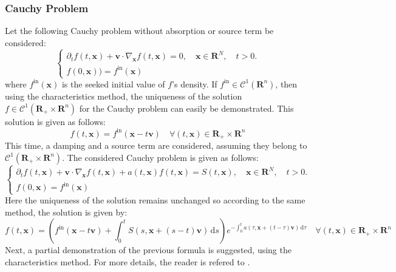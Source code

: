\documentclass[a4paper, 11pt]{article}
\newcommand{\bm}{\symbf}
\newcommand{\di}{\ensuremath{\, \mathrm{d}}}
\begin{document}
\subsubsection{Cauchy Problem}

Let the following Cauchy problem without absorption or source term be considered:
\[
\begin{cases}
\partial_t f(t,\bm{x})+\bm{v} \cdot \nabla_{\bm{x}} f(t,\bm{x})=0, \quad \bm{x} \in \bm{R}^N, \quad t>0.\\
f(0,\bm{x})) = f^{\mathrm{in}}(\bm{x})
\end{cases}
\]
where $f^{\mathrm{in}}(\bm{x})$ is the seeked initial value of $f$'s density. If $f^{\mathrm{in}} \in \mathcal{C}^1(\bm{R}^n)$, then using the characteristics method, the uniqueness of the solution $f \in \mathcal{C}^1(\bm{R}_+ \times \bm{R}^n)$ for the Cauchy problem can easily be demonstrated. This solution is given as follows:
\begin{equation}
f(t,\bm{x})=f^{\mathrm{in}}(\bm{x}-t\bm{v}) \quad \forall (t,\bm{x}) \in \bm{R}_+ \times \bm{R}^n 
\end{equation}
This time, a damping and a source term are considered, assuming they belong to $\mathcal{C}^1(\bm{R}_+ \times \bm{R}^n)$. The considered Cauchy problem is given as follows:
\[
\begin{cases}
\partial_t f(t,\bm{x})+\bm{v} \cdot \nabla_{\bm{x}} f(t,\bm{x}) + a(t,\bm{x})f(t,\bm{x}) = S(t,\bm{x}), \quad \bm{x} \in \bm{R}^N, \quad t>0.\\
f(0,\bm{x}) = f^{\mathrm{in}}(\bm{x})
\end{cases}
\]
Here the uniqueness of the solution remains unchanged so according to the same method, the solution is given by: 
\begin{equation}
f(t,\bm{x})= \left(f^{\mathrm{in}}(\bm{x}-t\bm{v}) + \int_0 ^t S(s,\bm{x}+(s-t)\bm{v})\di s \right) e^{-\int_0 ^t a(\tau,\bm{x}+(t-\tau)\bm{v})\di\tau} \quad \forall (t,\bm{x}) \in \bm{R}_+ \times \bm{R}^n
\end{equation}
Next, a partial demonstration of the previous formula is suggested, using the characteristics method. For more details, the reader is refered to \cite{allaire:2019}.
\end{document}
